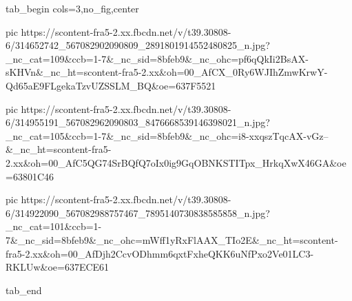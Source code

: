  
 
 
 
 


\ifcmt
  tab_begin cols=3,no_fig,center

     pic https://scontent-fra5-2.xx.fbcdn.net/v/t39.30808-6/314652742_567082902090809_2891801914552480825_n.jpg?_nc_cat=109&ccb=1-7&_nc_sid=8bfeb9&_nc_ohc=pf6qQkIi2BsAX-sKHVn&_nc_ht=scontent-fra5-2.xx&oh=00_AfCX_0Ry6WJIhZmwKrwY-Qd65aE9FLgekaTzvUZSSLM_BQ&oe=637F5521

     pic https://scontent-fra5-2.xx.fbcdn.net/v/t39.30808-6/314955191_567082962090803_8476668539146398021_n.jpg?_nc_cat=105&ccb=1-7&_nc_sid=8bfeb9&_nc_ohc=i8-xxqszTqcAX-vGz--&_nc_ht=scontent-fra5-2.xx&oh=00_AfC5QG74SrBQfQ7oIx0ig9GqOBNKSTITpx_HrkqXwX46GA&oe=63801C46

     pic https://scontent-fra5-2.xx.fbcdn.net/v/t39.30808-6/314922090_567082988757467_7895140730838585858_n.jpg?_nc_cat=101&ccb=1-7&_nc_sid=8bfeb9&_nc_ohc=mWff1yRxFlAAX_TIo2E&_nc_ht=scontent-fra5-2.xx&oh=00_AfDjh2CcvODhmm6qxtFxheQKK6uNfPxo2Ve01LC3-RKLUw&oe=637ECE61

  tab_end
\fi
